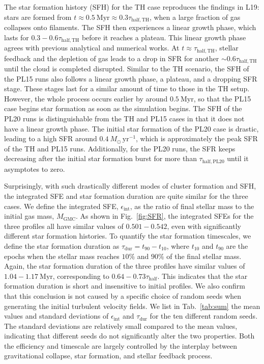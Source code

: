 \documentclass[fleqn,usenatbib]{mnras}
\begin{document}
The star formation history (SFH) for the TH case reproduces the findings in L19: stars are formed from $t\approx0.5\ \mathrm{Myr}\approx0.3\tau_\mathrm{half,TH}$, when a large fraction of gas collapses onto filaments.
The SFH then experiences a linear growth phase, which lasts for $0.3-0.6\tau_\mathrm{half,TH}$ before it reaches a plateau.
This linear growth phase agrees with previous analytical \citep[e.g.][]{murray_star_2015} and numerical \citep[e.g.][]{lee_time-varying_2015, murray_collapse_2017, grudic_when_2018} works.
At $t\approx \tau_\mathrm{half,TH}$, stellar feedback and the depletion of gas leads to a drop in SFR for another $\sim0.6\tau_\mathrm{half,TH}$ until the cloud is completed disrupted.
Similar to the TH scenario, the SFH of the PL15 runs also follows a linear growth phase, a plateau, and a dropping SFR stage.
These stages last for a similar amount of time to those in the TH setup.
However, the whole process occurs earlier by around $0.5\ \mathrm{Myr}$, so that the PL15 case begins star formation as soon as the simulation begins.
The SFH of the PL20 runs is distinguishable from the TH and PL15 cases in that it does not have a linear growth phase.
The initial star formation of the PL20 case is drastic, leading to a high SFR around $0.4\ M_\odot\,\mathrm{yr^{-1}}$, which is approximately the peak SFR of the TH and PL15 runs.
Additionally, for the PL20 runs, the SFR keeps decreasing after the initial star formation burst for more than $\tau_\mathrm{half,PL20}$ until it asymptotes to zero.

Surprisingly, with such drastically different modes of cluster formation and SFH, the integrated SFE and star formation duration are quite similar for the three cases.
We define the integrated SFE, $\epsilon_{\mathrm{int}}$, as the ratio of final stellar mass to the initial gas mass, $M_\mathrm{GMC}$.
As shown in Fig.~\ref{fig:SFR}, the integrated SFEs for the three profiles all have similar values of $0.501-0.542$, even with significantly different star formation histories.
To quantify the star formation timescales, we define the star formation duration as $\tau_\mathrm{dur}=t_\mathrm{90}-t_\mathrm{10}$, where $t_\mathrm{10}$ and $t_\mathrm{90}$ are the epochs when the stellar mass reaches $10\%$ and $90\%$ of the final stellar mass.
Again, the star formation duration of the three profiles have similar values of $1.04-1.17\ \mathrm{Myr}$, corresponding to $0.64-0.73\tau_\mathrm{half}$.
This indicates that the star formation duration is short and insensitive to initial profiles.
We also confirm that this conclusion is not caused by a specific choice of random seeds when generating the initial turbulent velocity fields.
We list in Tab.~\ref{tab:sum} the mean values and standard deviations of $\epsilon_{\mathrm{int}}$ and $\tau_\mathrm{dur}$ for the ten different random seeds.
The standard deviations are relatively small compared to the mean values, indicating that different seeds do not significantly alter the two properties.
Both the efficiency and timescale are largely controlled by the interplay between gravitational collapse, star formation, and stellar feedback process.
\end{document}
